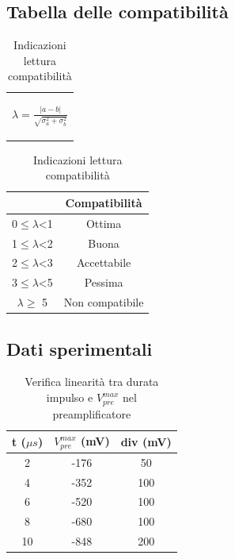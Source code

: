 \documentclass{article}
\begin{document}
\subsection{Tabella delle compatibilità}
\medskip
\begin{table}[H]
    \centering
    \begin{tabular}{c}
        \begin{Large}
        $\lambda=\frac{|a-b|}{\sqrt{\sigma_a^2+\sigma_b^2}}$
        \end{Large}\\
    \end{tabular}
    \hspace{0.5cm}
    \begin{tabular}{cc}
        \toprule
        &       \textbf{Compatibilità   }       \\
        \midrule
        0$\leq \lambda$<1   &Ottima                 \\
        1$\leq \lambda$<2   &Buona                  \\
        2$\leq \lambda$<3   &Accettabile            \\
        3$\leq\lambda$<5   &Pessima                \\
        $ \lambda \geq $  5     &Non compatibile        \\
        \bottomrule
    \end{tabular}
    \caption{Indicazioni lettura compatibilità}
    \label{tab:compatibilità}
\end{table}

\subsection{Dati sperimentali}

\begin{table}[H]
    \centering
    \begin{tabular}{ccc}
        \toprule
        t ($\mu s$) & $V_{pre}^{max}$ (mV) & div (mV) \\
        \midrule
        2 & -176 & 50 \\
        4 & -352 & 100 \\
        6 & -520 & 100 \\
        8 & -680 & 100 \\
        10 & -848 & 200 \\
        \bottomrule
    \end{tabular}
    \caption{Verifica linearità tra durata impulso e $V_{pre}^{max}$ nel preamplificatore}
\end{table}
\end{document}
